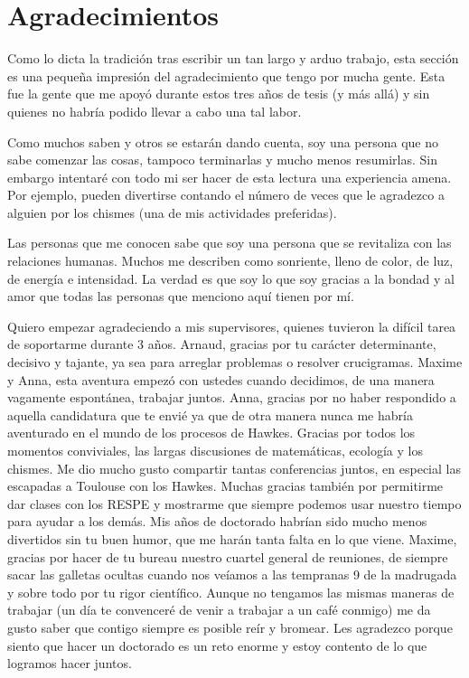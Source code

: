 \chapter{Agradecimientos}

Como lo dicta la tradición tras escribir un tan largo y arduo trabajo, esta sección es una pequeña impresión del agradecimiento que tengo por mucha gente. 
Esta fue la gente que me apoyó durante estos tres años de tesis (y más allá) y sin quienes no habría podido llevar a cabo una tal labor. 

Como muchos saben y otros se estarán dando cuenta, soy una persona que no sabe comenzar las cosas, tampoco terminarlas y mucho menos resumirlas. Sin embargo intentaré con todo mi ser hacer de esta lectura una experiencia amena. Por ejemplo, pueden divertirse contando el número de veces que le agradezco a alguien por los chismes (una de mis actividades preferidas).

Las personas que me conocen sabe que soy una persona que se revitaliza con las relaciones humanas. Muchos me describen como sonriente, lleno de color, de luz, de energía e intensidad. La verdad es que soy lo que soy gracias a la bondad y al amor que todas las personas que menciono aquí tienen por mí.
\vspace{5mm}

Quiero empezar agradeciendo a mis supervisores, quienes tuvieron la difícil tarea de soportarme durante 3 años. Arnaud, gracias por tu carácter determinante, decisivo y tajante, ya sea para arreglar problemas o resolver crucigramas. Maxime y Anna, esta aventura empezó con ustedes cuando decidimos, de una manera vagamente espontánea, trabajar juntos. Anna, gracias por no haber respondido a aquella candidatura que te envié ya que de otra manera nunca me habría aventurado en el mundo de los procesos de Hawkes. Gracias por todos los momentos conviviales, las largas discusiones de matemáticas, ecología y los chismes. Me dio mucho gusto compartir tantas conferencias juntos, en especial las escapadas a Toulouse con los Hawkes. Muchas gracias también por permitirme dar clases con los RESPE y mostrarme que siempre podemos usar nuestro tiempo para ayudar a los demás. Mis años de doctorado habrían sido mucho menos divertidos sin tu buen humor, que me harán tanta falta en lo que viene. Maxime, gracias por hacer de tu bureau nuestro cuartel general de reuniones, de siempre sacar las galletas ocultas cuando nos veíamos a las tempranas 9 de la madrugada y sobre todo por tu rigor científico. Aunque no tengamos las mismas maneras de trabajar (un día te convenceré de venir a trabajar a un café conmigo) me da gusto saber que contigo siempre es posible reír y bromear. Les agradezco porque siento que hacer un doctorado es un reto enorme y estoy contento de lo que logramos hacer juntos.

